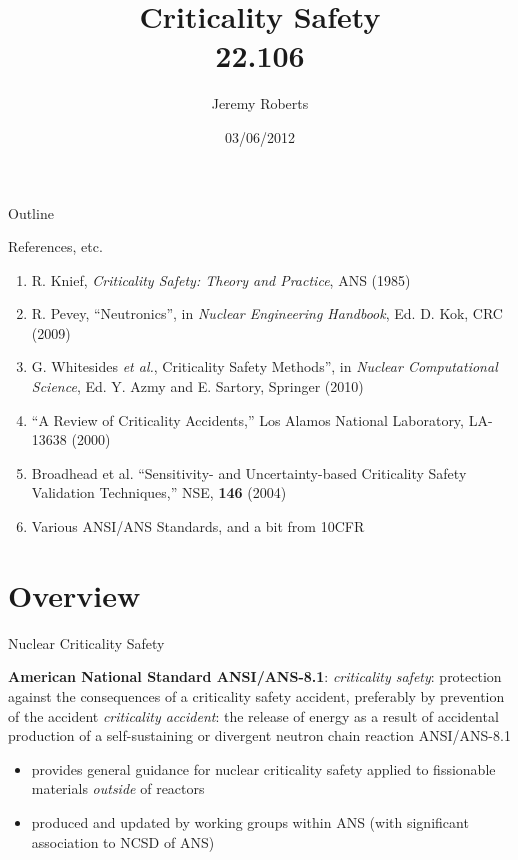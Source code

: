 \documentclass[10pt]{beamer}
\title %
[Criticality Safety]{Criticality Safety \\ 22.106}
\author[Roberts]{Jeremy Roberts}
\institute[22.106] %
 {}
\date
{03/06/2012}
\begin{document}
\begin{frame}[plain]
  \titlepage
\end{frame}

\begin{frame}{Outline}
  \tableofcontents
\end{frame}

\begin{frame}{References, etc.}
\begin{enumerate}
 \item R. Knief, {\it Criticality Safety: Theory and Practice}, ANS (1985)
 \item R. Pevey, ``Neutronics'', in {\it Nuclear Engineering Handbook},
       Ed. D. Kok, CRC (2009)
 \item G. Whitesides {\it et al.}, Criticality Safety Methods'', in 
        {\it Nuclear Computational Science},
       Ed. Y. Azmy and E. Sartory, Springer (2010)
 \item ``A Review of Criticality  Accidents,'' Los Alamos National Laboratory,
       LA-13638 (2000)
 \item Broadhead et al. ``Sensitivity- and Uncertainty-based Criticality 
       Safety Validation Techniques,'' NSE, {\bf 146} (2004)
 \item Various ANSI/ANS Standards, and a bit from 10CFR
\end{enumerate}
\end{frame}

\section{Overview}

\begin{frame}{Nuclear Criticality Safety}

{\bf American National Standard ANSI/ANS-8.1}:
\vfill
{\it criticality safety}: protection against the consequences of a criticality 
safety accident, preferably by prevention of the accident
\vfill
{\it criticality accident}: the release of energy as a 
result of accidental production of a self-sustaining or
divergent neutron chain reaction
\vfill 
ANSI/ANS-8.1 
\begin{itemize}
 \item provides general guidance for  nuclear criticality safety 
       applied to fissionable materials \textit{outside} of reactors
 \item produced and updated by working groups within ANS (with significant
       association to NCSD of ANS)
\end{itemize}

\end{frame}
\end{document}
